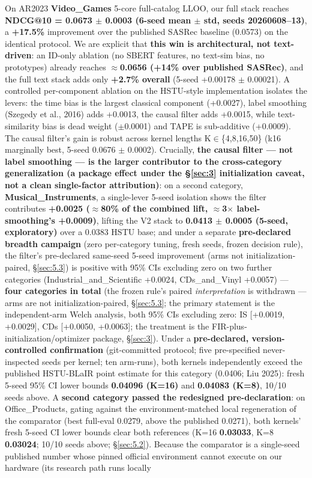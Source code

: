 On AR2023 \textbf{Video\_Games} 5-core full-catalog LLOO, our full stack reaches \textbf{NDCG@10 = 0.0673 \ensuremath{\pm} 0.0003 (6-seed mean \ensuremath{\pm} std, seeds 20260608--13)}, a \textbf{+17.5\%} improvement over the published SASRec baseline (0.0573) on the identical protocol. We are explicit that \textbf{this win is architectural, not text-driven}: an ID-only ablation (no SBERT features, no text-sim bias, no prototypes) already reaches \textbf{\ensuremath{\approx}0.0656 (+14\% over published SASRec)}, and the full text stack adds only \textbf{+2.7\% overall} (5-seed +0.00178 \ensuremath{\pm} 0.00021). A controlled per-component ablation on the HSTU-style implementation isolates the levers: the time bias is the largest classical component (+0.0027), label smoothing (Szegedy et al., 2016) adds +0.0013, the causal filter adds +0.0015, while text-similarity bias is dead weight (\ensuremath{\pm}0.0001) and TAPE is sub-additive (+0.0009). The causal filter's gain is robust across kernel lengths K\ensuremath{\in}\{4,8,16,50\} (k16 marginally best, 5-seed 0.0676 \ensuremath{\pm} 0.0002). Crucially, \textbf{the causal filter --- not label smoothing --- is the larger contributor to the cross-category generalization (a package effect under the \S\ref{sec:3} initialization caveat, not a clean single-factor attribution)}: on a second category, \textbf{Musical\_Instruments}, a single-lever 5-seed isolation shows the filter contributes \textbf{+0.0025 (\ensuremath{\approx}80\% of the combined lift, \ensuremath{\approx}3\ensuremath{\times} label-smoothing's +0.0009)}, lifting the V2 stack to \textbf{0.0413 \ensuremath{\pm} 0.0005 (5-seed, exploratory)} over a 0.0383 HSTU base; and under a separate \textbf{pre-declared breadth campaign} (zero per-category tuning, fresh seeds, frozen decision rule), the filter's pre-declared same-seed 5-seed improvement (arms not initialization-paired, \S\ref{sec:5.3}) is positive with 95\% CIs excluding zero on two further categories (Industrial\_and\_Scientific +0.0024, CDs\_and\_Vinyl +0.0057) --- \textbf{four categories in total} (the frozen rule's paired \emph{interpretation} is withdrawn --- arms are not initialization-paired, \S\ref{sec:5.3}; the primary statement is the independent-arm Welch analysis, both 95\% CIs excluding zero: IS {[}+0.0019, +0.0029{]}, CDs {[}+0.0050, +0.0063{]}; the treatment is the FIR-plus-initialization/optimizer package, \S\ref{sec:3}). Under a \textbf{pre-declared, version-controlled confirmation} (git-committed protocol; five pre-specified never-inspected seeds per kernel; ten arm-runs), both kernels independently exceed the published HSTU-BLaIR point estimate for this category (0.0406; Liu 2025): fresh 5-seed 95\% CI lower bounds \textbf{0.04096 (K=16)} and \textbf{0.04083 (K=8)}, 10/10 seeds above. A \textbf{second category passed the redesigned pre-declaration}: on Office\_Products, gating against the environment-matched local regeneration of the comparator (best full-eval 0.0279, above the published 0.0271), both kernels' fresh 5-seed CI lower bounds clear both references (K=16 \textbf{0.03033}, K=8 \textbf{0.03024}; 10/10 seeds above; \S\ref{sec:5.2}). Because the comparator is a single-seed published number whose pinned official environment cannot execute on our hardware (its research path runs locally 